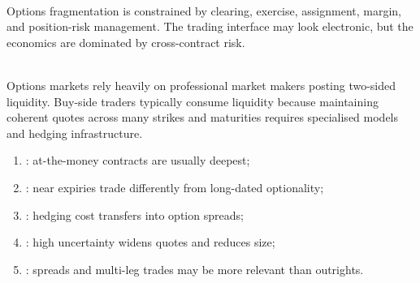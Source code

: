 \documentclass[a4paper,oneside,openany]{book}
\begin{document}
\begin{caveat} \\
Options fragmentation is constrained by clearing, exercise, assignment, margin, and position-risk management. The trading interface may look electronic, but the economics are dominated by cross-contract risk.
\end{caveat}

\begin{mechanism} \\
Options markets rely heavily on professional market makers posting two-sided liquidity. Buy-side traders typically consume liquidity because maintaining coherent quotes across many strikes and maturities requires specialised models and hedging infrastructure.
\end{mechanism}

\begin{taxonomy} 
\begin{enumerate}[label=\roman*.]
\setlength{\itemsep}{0pt}
\item {}: at-the-money contracts are usually deepest;
\item {}: near expiries trade differently from long-dated optionality;
\item {}: hedging cost transfers into option spreads;
\item {}: high uncertainty widens quotes and reduces size;
\item {}: spreads and multi-leg trades may be more relevant than outrights.
\end{enumerate}
\end{taxonomy}
\end{document}
